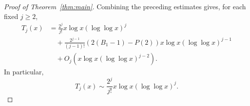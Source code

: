 \begin{proof}[Proof of Theorem~\ref{thm:main}]
Combining the preceding estimates gives, for each fixed $j\geq2$,
\[
\begin{aligned}
    T_j(x)
    &=
    \frac{2^j}{j!}
    x\log x(\log\log x)^j  \\
    &\quad+
    \frac{2^{j-1}}{(j-1)!}
    \left(2(B_1-1)-P(2)\right)
    x\log x(\log\log x)^{j-1}  \\
    &\quad+
    O_j\left(x\log x(\log\log x)^{j-2}\right).
\end{aligned}
\]
In particular,
\[
    T_j(x)\sim \frac{2^j}{j!}x\log x(\log\log x)^j.
\]
\end{proof}
